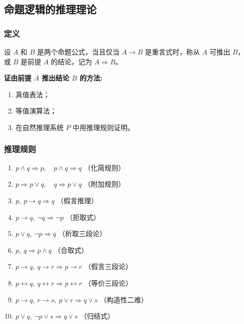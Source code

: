 \subsection{命题逻辑的推理理论}

\subsubsection{定义}

设 $A$ 和 $B$ 是两个命题公式，当且仅当 $A \to B$ 是重言式时，称从 $A$ 可推出 $B$，或 $B$ 是前提 $A$ 的结论，记为 $A \Rightarrow B$。

\textbf{证由前提 $A$ 推出结论 $B$ 的方法:}

\begin{enumerate}
	\item 真值表法；
	\item 等值演算法；
	\item 在自然推理系统 $P$ 中用推理规则证明。
\end{enumerate}

\subsubsection{推理规则}

\begin{enumerate}
	\item $p \land q \Rightarrow p,\quad p \land q \Rightarrow q$ \hfill （化简规则）
	\item $p \Rightarrow p \lor q,\quad q \Rightarrow p \lor q$ \hfill （附加规则）
	\item $p,\ p \to q \Rightarrow q$ \hfill （假言推理）
	\item $p \to q,\ \neg q \Rightarrow \neg p$ \hfill （拒取式）
	\item $p \lor q,\ \neg p \Rightarrow q$ \hfill （析取三段论）
	\item $p,\ q \Rightarrow p \land q$ \hfill （合取式）
	\item $p \to q,\ q \to r \Rightarrow p \to r$ \hfill （假言三段论）
	\item $p \leftrightarrow q,\ q \leftrightarrow r \Rightarrow p \leftrightarrow r$ \hfill （等价三段论）
	\item $p \to q,\ r \to s,\ p \lor r \Rightarrow q \lor s$ \hfill （构造性二难）
	\item $p \lor q,\ \neg p \lor s \Rightarrow q \lor s$ \hfill （归结式）
\end{enumerate}

